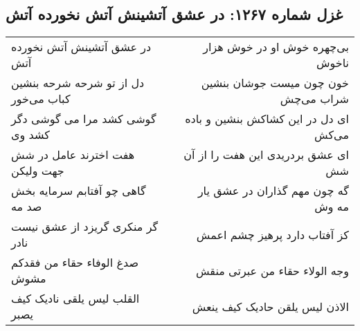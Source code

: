 \begin{center}
\section*{غزل شماره ۱۲۶۷: در عشق آتشینش آتش نخورده آتش}
\label{sec:1267}
\begin{longtable}{l p{0.5cm} r}
در عشق آتشینش آتش نخورده آتش
&&
بی‌چهره خوش او در خوش هزار ناخوش
\\
دل از تو شرحه شرحه بنشین کباب می‌خور
&&
خون چون میست جوشان بنشین شراب می‌چش
\\
گوشی کشد مرا می گوشی دگر کشد وی
&&
ای دل در این کشاکش بنشین و باده می‌کش
\\
هفت اخترند عامل در شش جهت ولیکن
&&
ای عشق بردریدی این هفت را از آن شش
\\
گاهی چو آفتابم سرمایه بخش صد مه
&&
گه چون مهم گذاران در عشق یار مه وش
\\
گر منکری گریزد از عشق نیست نادر
&&
کز آفتاب دارد پرهیز چشم اعمش
\\
صدغ الوفاء حقاء من فقدکم مشوش
&&
وجه الولاء حقاء من عبرتی منقش
\\
القلب لیس یلقی نادیک کیف یصبر
&&
الاذن لیس یلقن حادیک کیف ینعش
\\
\end{longtable}
\end{center}
